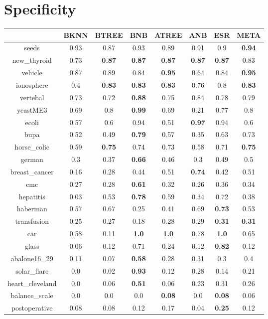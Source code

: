 \documentclass{article}%
\begin{document}
%
\section*{Specificity}%
\begin{tabular}{c|ccccccc}%
\hline%
&BKNN&BTREE&BNB&ATREE&ANB&ESR&META\\%
\hline%
seeds&0.93&0.87&0.93&0.89&0.91&0.9&\textbf{0.94}\\%
new\_thyroid&0.73&\textbf{0.87}&\textbf{0.87}&\textbf{0.87}&\textbf{0.87}&\textbf{0.87}&0.83\\%
vehicle&0.87&0.89&0.84&\textbf{0.95}&0.64&0.84&\textbf{0.95}\\%
ionosphere&0.4&\textbf{0.83}&\textbf{0.83}&\textbf{0.83}&0.76&0.8&\textbf{0.83}\\%
vertebal&0.73&0.72&\textbf{0.88}&0.75&0.84&0.78&0.79\\%
yeastME3&0.69&0.8&\textbf{0.99}&0.69&0.21&0.77&0.8\\%
ecoli&0.57&0.6&0.94&0.51&\textbf{0.97}&0.94&0.6\\%
bupa&0.52&0.49&\textbf{0.79}&0.57&0.35&0.63&0.73\\%
horse\_colic&0.59&\textbf{0.75}&0.74&0.73&0.58&0.71&\textbf{0.75}\\%
german&0.3&0.37&\textbf{0.66}&0.46&0.3&0.49&0.5\\%
breast\_cancer&0.16&0.28&0.44&0.51&\textbf{0.74}&0.42&0.51\\%
cmc&0.27&0.28&\textbf{0.61}&0.32&0.26&0.36&0.34\\%
hepatitis&0.03&0.53&\textbf{0.78}&0.59&0.34&0.72&0.38\\%
haberman&0.57&0.67&0.25&0.41&0.69&\textbf{0.73}&0.53\\%
transfusion&0.25&0.27&0.18&0.28&0.29&\textbf{0.31}&\textbf{0.31}\\%
car&0.58&0.11&\textbf{1.0}&\textbf{1.0}&0.78&\textbf{1.0}&0.65\\%
glass&0.06&0.12&0.71&0.24&0.12&\textbf{0.82}&0.12\\%
abalone16\_29&0.11&0.07&\textbf{0.58}&0.28&0.31&0.3&0.4\\%
solar\_flare&0.0&0.02&\textbf{0.93}&0.12&0.28&0.14&0.21\\%
heart\_cleveland&0.0&0.06&\textbf{0.51}&0.06&0.23&0.31&0.26\\%
balance\_scale&0.0&0.0&0.0&\textbf{0.08}&0.0&\textbf{0.08}&0.06\\%
postoperative&0.08&0.08&0.12&0.17&0.04&\textbf{0.25}&0.12\\%
\end{tabular}
\end{document}
